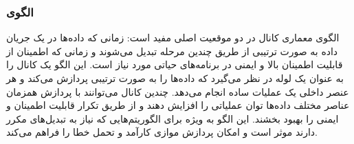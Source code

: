 \subsubsection{الگوی }
\label{archChannelSec}
\begin{RTL}
الگوی معماری کانال \cite{ref4} در دو موقعیت اصلی مفید است:
زمانی که داده‌ها در یک جریان داده به صورت ترتیبی از طریق
چندین مرحله تبدیل می‌شوند و زمانی که اطمینان از قابلیت اطمینان
بالا و ایمنی در برنامه‌های حیاتی مورد نیاز است.
این الگو یک کانال را به عنوان یک لوله در نظر می‌گیرد که
داده‌ها را به صورت ترتیبی پردازش می‌کند و هر عنصر داخلی
یک عملیات ساده انجام می‌دهد. چندین کانال می‌توانند با پردازش همزمان
عناصر مختلف داده‌ها توان عملیاتی را افزایش دهند و از طریق تکرار
قابلیت اطمینان و ایمنی را بهبود بخشند. این الگو به ویژه برای الگوریتم‌هایی
که نیاز به تبدیل‌های مکرر دارند موثر است و امکان پردازش
موازی کارآمد و تحمل خطا را فراهم می‌کند.
\end{RTL}